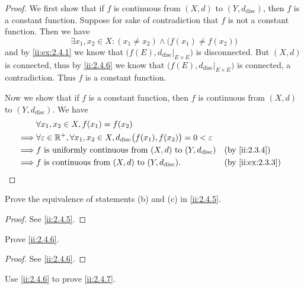\begin{proof}
  We first show that if \(f\) is continuous from \((X, d)\) to \((Y, d_{\text{disc}})\), then \(f\) is a constant function.
  Suppose for sake of contradiction that \(f\) is not a constant function.
  Then we have
  \[
    \exists x_1, x_2 \in X : (x_1 \neq x_2) \land \big(f(x_1) \neq f(x_2)\big)
  \]
  and by \cref{ii:ex:2.4.1} we know that \(\big(f(E), d_{\text{disc}}|_{E \times E}\big)\) is disconnected.
  But \((X, d)\) is connected, thus by \cref{ii:2.4.6} we know that \(\big(f(E), d_{\text{disc}}|_{E \times E}\big)\) is connected, a contradiction.
  Thus \(f\) is a constant function.

  Now we show that if \(f\) is a constant function, then \(f\) is continuous from \((X, d)\) to \((Y, d_{\text{disc}})\).
  We have
  \begin{align*}
             & \forall x_1, x_2 \in X, f(x_1) = f(x_2)                                                                                               \\
    \implies & \forall \varepsilon \in \R^+, \forall x_1, x_2 \in X, d_{\text{disc}}\big(f(x_1), f(x_2)\big) = 0 < \varepsilon                       \\
    \implies & f \text{ is uniformly continuous from } (X, d) \text{ to } (Y, d_{\text{disc}})                                 &  & \by{ii:2.3.4}    \\
    \implies & f \text{ is continuous from } (X, d) \text{ to } (Y, d_{\text{disc}}).                                          &  & \by{ii:ex:2.3.3}
  \end{align*}
\end{proof}

\begin{ex}\label{ii:ex:2.4.3}
  Prove the equivalence of statements (b) and (c) in \cref{ii:2.4.5}.
\end{ex}

\begin{proof}
  See \cref{ii:2.4.5}.
\end{proof}

\begin{ex}\label{ii:ex:2.4.4}
  Prove \cref{ii:2.4.6}.
\end{ex}

\begin{proof}
  See \cref{ii:2.4.6}.
\end{proof}

\begin{ex}\label{ii:ex:2.4.5}
  Use \cref{ii:2.4.6} to prove \cref{ii:2.4.7}.
\end{ex}

